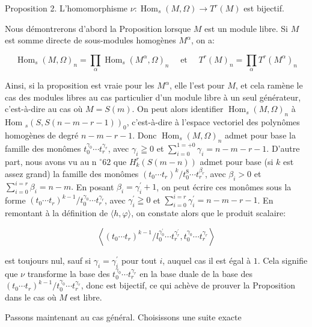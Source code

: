 Proposition 2. L'homomorphisme $\nu: \operatorname{Hom}_{s}(M, \Omega) \rightarrow T^{r}(M)$ est bijectif.

Nous démontrerons d'abord la Proposition lorsque $M$ est un module libre. Si $M$ est somme directe de sous-modules homogènes $M^{\alpha}$, on a:

$$
\operatorname{Hom}_{s}(M, \Omega)_{n}=\prod_{\alpha} \operatorname{Hom}_{s}\left(M^{\alpha}, \Omega\right)_{n} \quad \text { et } \quad T^{r}(M)_{n}=\prod_{\alpha} T^{r}\left(M^{\alpha}\right)_{n}
$$

Ainsi, si la proposition est vraie pour les $M^{\alpha}$, elle l'est pour $M$, et cela ramène le cas des modules libres au cas particulier d'un module libre à un seul générateur, c'est-à-dire au cas où $M=S(m) .$ On peut alors identifier $\operatorname{Hom}_{s}(M, \Omega)_{n}$ à Hom $_{s}(S, S(n-m-r-1))_{0}$, c'est-à-dire à l'espace vectoriel des polynômes homogènes de degré $n-m-r-1$. Donc $\operatorname{Hom}_{s}(M, \Omega)_{n}$ admet pour base la famille des monômes $t_{0}^{\gamma_{0}} \cdots t_{r}^{\gamma_{r}}$, avec $\gamma_{i} \geqq 0$ et $\sum_{i=0}^{1=+0} \gamma_{i}=n-m-r-1$. D'autre part, nous avons vu au n ${ }^{\circ} 62$ que $H_{k}^{r}(S(m-n))$ admet pour base (si $k$ est assez grand) la famille des monômes $\left(t_{0} \cdots t_{r}\right)^{k} / t_{0}^{8} \cdots t_{r}^{\beta_{r}}$, avec $\beta_{i}>0$ et $\sum_{i=0}^{i=r} \beta_{i}=n-m .$ En posant $\beta_{i}=\gamma_{i}^{\prime}+1$, on peut écrire ces monômes sous la forme $\left(t_{0} \cdots t_{r}\right)^{k-1} / t_{0}^{\gamma_{0}} \cdots t_{r}^{\gamma_{r}}$, avec $\gamma_{i}^{\prime} \geqq 0$ et $\sum_{i=0}^{i=r} \gamma_{i}^{\prime}=n-m-r-1$. En remontant à la définition de $\langle h, \varphi\rangle$, on constate alors que le produit scalaire:

$$
\left\langle\left(t_{0} \cdots t_{r}\right)^{k-1} / l_{0}^{\gamma_{0}^{\prime}} \cdots t_{r}^{\gamma_{r}^{\prime}}, t_{0}^{\gamma_{0}} \cdots t_{r}^{\gamma_{r}}\right\rangle
$$

est toujours nul, sauf si $\gamma_{i}=\gamma_{i}^{\prime}$ pour tout $i$, auquel cas il est égal à $1 .$ Cela signifie que $\nu$ transforme la base des $t_{0}^{\gamma_{0}} \cdots t_{r}^{\gamma_{r}}$ en la base duale de la base des $\left(t_{0} \cdots t_{r}\right)^{k-1} / t_{0}^{\gamma_{0}} \cdots t_{r}^{\gamma_{r}}$, donc est bijectif, ce qui achève de prouver la Proposition dans le cas où $M$ est libre.

Passons maintenant au cas général. Choisissons une suite exacte

